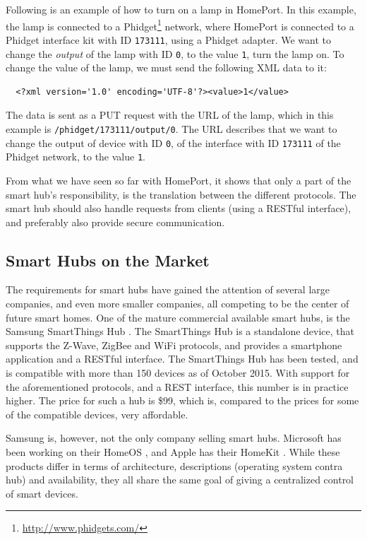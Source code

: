 Following is an example of how to turn on a lamp in HomePort.
In this example, the lamp is connected to a Phidget\footnote{\url{http://www.phidgets.com/}} network, 
where HomePort is connected to a Phidget interface kit with ID \texttt{173111}, 
using a Phidget adapter. 
We want to change the \emph{output} of the lamp with ID \texttt{0}, 
to the value \texttt{1}, \ie turn the lamp on. 
To change the value of the lamp, 
we must send the following XML data to it:

\begin{verbatim}
  <?xml version='1.0' encoding='UTF-8'?><value>1</value>
\end{verbatim}

The data is sent as a PUT request with the URL of the lamp, 
which in this example is \texttt{/phidget/173111/output/0}. 
The URL describes that we want to change the output of device with ID \texttt{0}, 
of the interface with ID \texttt{173111} of the Phidget network, to the value \texttt{1}.

From what we have seen so far with HomePort, 
it shows that only a part of the smart hub's responsibility, 
is the translation between the different protocols. 
The smart hub should also handle requests from clients (\eg using a RESTful interface), 
and preferably also provide secure communication. 

\subsection{Smart Hubs on the Market}\label{sec:smarthubsmarket}
The requirements for smart hubs have gained the attention of several large companies, 
and even more smaller companies, 
all competing to be the center of future smart homes. 
One of the mature commercial available smart hubs, 
is the Samsung SmartThings Hub \cite{SMARTTHINGS}. 
The SmartThings Hub is a standalone device, 
that supports the Z-Wave, ZigBee and WiFi protocols, 
and provides a smartphone application and a RESTful interface. 
The SmartThings Hub has been tested, 
and is compatible with more than \num{150} devices as of October 2015.
With support for the aforementioned protocols, 
and a REST interface, this number is in practice higher.  
The price for such a hub is \$99, 
which is, compared to the prices for some of the compatible devices, very affordable. 

Samsung is, however, not the only company selling smart hubs. 
Microsoft has been working on their HomeOS \cite{HOMEOS}, 
and Apple has their HomeKit \cite{HOMEKIT}.
While these products differ in terms of architecture, descriptions (operating system contra hub) and availability,
they all share the same goal of giving a centralized control of smart devices. 

